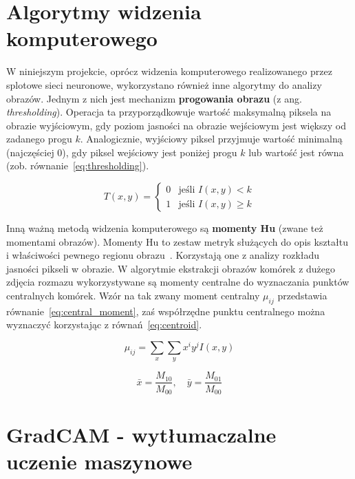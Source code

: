 \section{Algorytmy widzenia komputerowego}

W niniejszym projekcie, oprócz widzenia komputerowego realizowanego przez splotowe sieci neuronowe, wykorzystano również inne algorytmy do analizy obrazów.
Jednym z nich jest mechanizm \textbf{progowania obrazu} (z ang. \textit{thresholding}).
Operacja ta przyporządkowuje wartość maksymalną piksela na obrazie wyjściowym, gdy poziom jasności na obrazie wejściowym jest większy od zadanego progu $k$.
Analogicznie, wyjściowy piksel przyjmuje wartość minimalną (najczęściej $0$), gdy piksel wejściowy jest poniżej progu $k$ lub wartość jest równa (zob.
równanie~\ref{eq:thresholding}).

\begin{equation}
    T(x, y) =
    \begin{cases}
        0 & \text{jeśli } I(x, y) < k \\
        1 & \text{jeśli } I(x, y) \geq k
    \end{cases}\label{eq:thresholding}
\end{equation}

Inną ważną metodą widzenia komputerowego są \textbf{momenty Hu} (zwane też momentami obrazów).
Momenty Hu to zestaw metryk służących do opis kształtu i właściwości pewnego regionu obrazu~\cite{vision}.
Korzystają one z analizy rozkładu jasności pikseli w obrazie.
W algorytmie ekstrakcji obrazów komórek z dużego zdjęcia rozmazu wykorzystywane są momenty centralne do wyznaczania punktów centralnych komórek.
Wzór na tak zwany moment centralny $\mu_{ij}$ przedstawia równanie~\ref{eq:central_moment}, zaś współrzędne punktu centralnego można wyznaczyć korzystając z równań~\ref{eq:centroid}.

\begin{equation}
    \mu_{ij} = \sum_x \sum_y x^i y^j I(x, y)\label{eq:central_moment}
\end{equation}

\begin{equation}
    \bar{x} = \frac{M_{10}}{M_{00}}, \quad \bar{y} = \frac{M_{01}}{M_{00}}\label{eq:centroid}
\end{equation}


\section{GradCAM - wytłumaczalne uczenie maszynowe}

